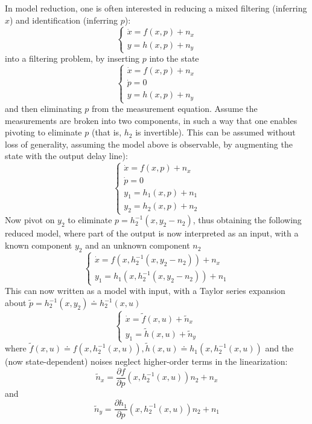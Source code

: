 \documentclass[]{article}
\newcommand{\bc}{\begin{cases}}
\newcommand{\ec}{\end{cases}}
\begin{document}
In model reduction, one is often interested in reducing a mixed filtering (inferring $x$) and identification (inferring $p$):
\begin{equation}
\bc
\dot x = f(x,p) +n_x \\
y = h(x,p) + n_y
\ec
\end{equation}
into a filtering problem, by inserting $p$ into the state
\begin{equation}
\bc
\dot x = f(x,p) +n_x \\
\dot p = 0 \\
y = h(x,p) + n_y
\ec
\end{equation}
and then eliminating $p$ from the measurement equation. Assume the measurements are broken into two components, in such a way that one enables pivoting to eliminate $p$ (that is, $h_2$ is invertible). This can be assumed without loss of generality, assuming the model above is observable, by augmenting the state with the output delay line):
\begin{equation}
\bc
\dot x = f(x,p) +n_x \\
\dot p = 0 \\
y_1 = h_1(x,p) + n_1\\
y_2 = h_2(x,p) + n_2
\ec
\end{equation}
Now pivot on $y_2$ to eliminate $p = h_2^{-1}(x, y_2-n_2)$, thus obtaining the following reduced model, where part of the output is now interpreted as an input, with a known component $y_2$ and an unknown component $n_2$
\begin{equation}
\bc
\dot x = f(x, h_2^{-1}(x, y_2-n_2)) +n_x \\
y_1 = h_1(x, h_2^{-1}(x, y_2-n_2)) + n_1
\ec
\end{equation}
This can now written as a model with input, with a Taylor series expansion about $\tilde p = h_2^{-1}(x, y_2) \doteq h_2^{-1}(x, u)$
\begin{equation}
\bc
\dot x = \tilde f(x, u) +\tilde n_x \\
y_1 = \tilde h(x, u) + \tilde n_y
\ec
\end{equation}
where $\tilde f(x,u) \doteq f(x, h_2^{-1}(x,u)), \tilde h(x,u) \doteq h_1(x,h_2^{-1}(x, u))$ and the (now state-dependent) noises neglect higher-order terms in the linearization:
\begin{equation}
\tilde n_x = \frac{\partial f}{\partial p}(x,h_2^{-1}(x,u)) n_2 + n_x
\end{equation}
and 
\begin{equation}
\tilde n_y = \frac{\partial h_1}{\partial p}(x,h_2^{-1}(x,u)) n_2 + n_1
\end{equation}
\end{document}
